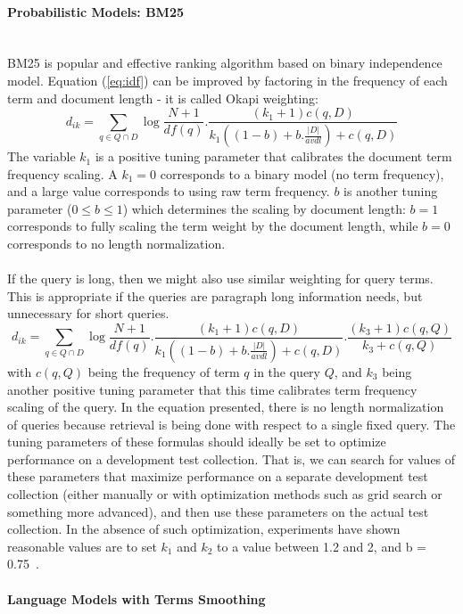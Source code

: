 \paragraph{Probabilistic Models: BM25}
\ \\
BM25 is popular and effective ranking algorithm based on binary independence model. Equation (\ref{eq:idf}) can be improved by factoring in the frequency of each term and document length - it is called Okapi weighting:
\begin{equation}
d_{ik}=\sum\limits_{q \in Q\cap D}\log\frac{N+1}{df(q)}.\frac{(k_{1}+1)c(q,D)}{k_{1}((1-b)+b.\frac{|D|}{avdl})+c(q,D)}
\label{eq:idfbm25}
\end{equation}
The variable $ k_{1} $ is a positive tuning parameter that calibrates the document term frequency scaling. A $ k_{1}=0 $  corresponds to a binary model (no term frequency), and a large value corresponds to using raw term
frequency. $ b $ is another tuning parameter ($ 0 \leq b \leq 1 $) which determines the scaling by document length: $ b = 1 $ corresponds to fully scaling the term weight by the document length, while $ b = 0 $ corresponds to no length normalization. \\\\
If the query is long, then we might also use similar weighting for query terms. This is appropriate if the queries are paragraph long information needs, but unnecessary for short queries.
\begin{equation}
d_{ik}=\sum\limits_{q \in Q\cap D}\log\frac{N+1}{df(q)}.\frac{(k_{1}+1)c(q,D)}{k_{1}((1-b)+b.\frac{|D|}{avdl})+c(q,D)}.\frac{(k_{3}+1)c(q,Q)}{k_{3}+c(q,Q)}
\label{eq:idfbm25}
\end{equation}
with $ c(q,Q) $ being the frequency of term $ q $ in the query $ Q $, and $ k_{3} $ being another positive tuning parameter that this time calibrates term frequency scaling of the query. In the equation presented, there is no length normalization of
queries because retrieval is being done with respect to a single fixed query. The tuning parameters of these formulas should ideally be set to optimize performance on a development test collection. That is, we can search for values of these parameters that maximize performance on a separate development test collection (either manually or with optimization methods such as grid search or something more advanced), and then use these parameters on the actual test collection. In the absence of such optimization, experiments have shown reasonable values are to set $ k_{1} $ and $ k_{2} $ to a value between 1.2 and 2, and b = 0.75~\citep{manning2008introduction}.

\paragraph{Language Models with Terms Smoothing}
\ \\
